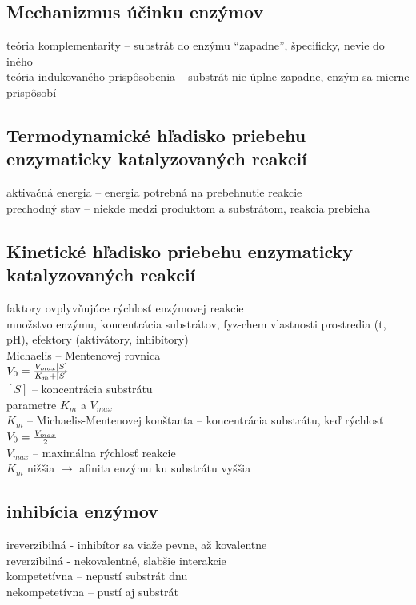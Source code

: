 \subsection*{Mechanizmus účinku enzýmov}
teória komplementarity -- substrát do enzýmu “zapadne”, špecificky, nevie do iného\\
teória indukovaného prispôsobenia -- substrát nie úplne zapadne, enzým sa mierne prispôsobí\\
\subsection*{Termodynamické hľadisko priebehu enzymaticky katalyzovaných reakcií}
aktivačná energia -- energia potrebná na prebehnutie reakcie\\
prechodný stav -- niekde medzi produktom a substrátom, reakcia prebieha\\
\subsection*{Kinetické hľadisko priebehu enzymaticky katalyzovaných reakcií}
faktory ovplyvňujúce rýchlosť enzýmovej reakcie\\
\tab množstvo enzýmu, koncentrácia substrátov, fyz-chem vlastnosti prostredia (t, pH), efektory (aktivátory, inhibítory)\\
Michaelis -- Mentenovej rovnica\\
\tab $V_0 = {{V_{max} [S]} \over {K_m + [S]}}$\\
\tab $[S]$ -- koncentrácia substrátu\\
\tab parametre $K_m$ a $V_{max}$\\
\tab \tab $K_m$ -- Michaelis-Mentenovej konštanta -- koncentrácia substrátu, keď rýchlosť $V_0 = {V_{max}\over 2}$\\
\tab \tab $V_{max}$ -- maximálna rýchlosť reakcie\\
\tab \tab $K_m$ nižšia $\rightarrow$ afinita enzýmu ku substrátu vyššia\\
\subsection*{inhibícia enzýmov}
ireverzibilná - inhibítor sa viaže pevne, až kovalentne\\
reverzibilná - nekovalentné, slabšie interakcie\\
\tab kompetetívna -- nepustí substrát dnu\\
\tab nekompetetívna -- pustí aj substrát\\
